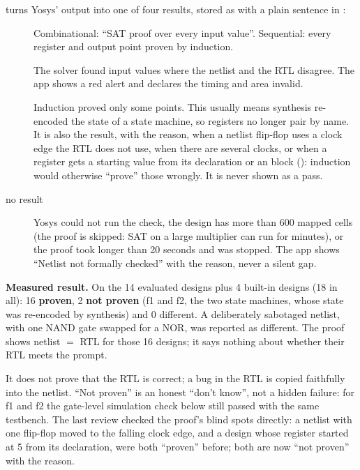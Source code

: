  turns Yosys' output into one of four results, stored as  with a plain sentence in :
\begin{description}
  \item[] Combinational: ``SAT proof over every input value''. Sequential: every register and output point proven by induction.
  \item[] The solver found input values where the netlist and the RTL disagree. The app shows a red alert and declares the timing and area invalid.
  \item[] Induction proved only some points. This usually means synthesis re-encoded the state of a state machine, so registers no longer pair by name. It is also the result, with the reason, when a netlist flip-flop uses a clock edge the RTL does not use, when there are several clocks, or when a register gets a starting value from its declaration or an  block (): induction would otherwise ``prove'' those wrongly. It is never shown as a pass.
  \item[no result] Yosys could not run the check, the design has more than 600 mapped cells (the proof is skipped: SAT on a large multiplier can run for minutes), or the proof took longer than 20 seconds and was stopped. The app shows ``Netlist not formally checked'' with the reason, never a silent gap.
\end{description}

\textbf{Measured result.} On the 14 evaluated designs plus 4 built-in designs (18 in all): 16 \textbf{proven}, 2 \textbf{not proven} (f1 and f2, the two state machines, whose state was re-encoded by synthesis) and 0 different. A deliberately sabotaged netlist, with one NAND gate swapped for a NOR, was reported as different. The proof shows netlist $=$ RTL for those 16 designs; it says nothing about whether their RTL meets the prompt.

\begin{warnbox}
It does not prove that the RTL is correct; a bug in the RTL is copied faithfully into the netlist. ``Not proven'' is an honest ``don't know'', not a hidden failure: for f1 and f2 the gate-level simulation check below still passed with the same testbench. The last review checked the proof's blind spots directly: a netlist with one flip-flop moved to the falling clock edge, and a design whose register started at 5 from its declaration, were both ``proven'' before; both are now ``not proven'' with the reason.
\end{warnbox}

